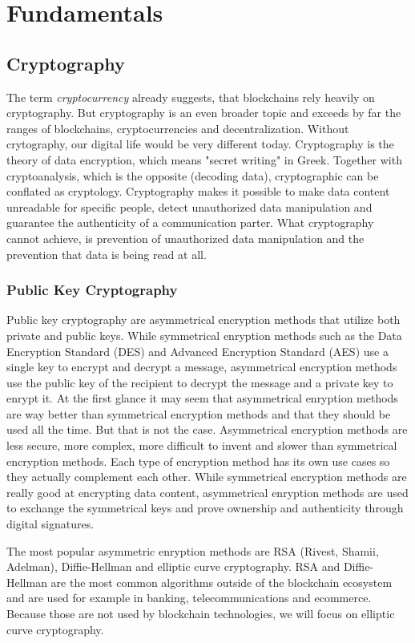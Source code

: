 \chapter{Fundamentals}
\label{cha:Fundamentals}

\section{Cryptography}

The term \textit{cryptocurrency} already suggests, that blockchains rely heavily on cryptography. But cryptography is an even broader topic and exceeds by far the ranges of blockchains, cryptocurrencies and decentralization. Without crytography, our digital life would be very different today. Cryptography is the theory of data encryption, which means "secret writing" in Greek. Together with cryptoanalysis, which is the opposite (decoding data), cryptographic can be conflated as cryptology. Cryptography makes it possible to make data content unreadable for specific people, detect unauthorized data manipulation and guarantee the authenticity of a communication parter. What cryptography cannot achieve, is prevention of unauthorized data manipulation and the prevention that data is being read at all.

\subsection{Public Key Cryptography}
Public key cryptography are asymmetrical encryption methods that utilize both private and public keys. While symmetrical enryption methods such as the Data Encryption Standard (DES) and Advanced Encryption Standard (AES) use a single key to encrypt and decrypt a message, asymmetrical encryption methods use the public key of the recipient to decrypt the message and a private key to enrypt it. At the first glance it may seem that asymmetrical enryption methods are way better than symmetrical encryption methods and that they should be used all the time. But that is not the case. Asymmetrical encryption methods are less secure, more complex, more difficult to invent and slower than symmetrical encryption methods. Each type of encryption method has its own use cases so they actually complement each other. While symmetrical encryption methods are really good at encrypting data content, asymmetrical enryption methods are used to exchange the symmetrical keys and prove ownership and authenticity through digital signatures.

The most popular asymmetric enryption methods are RSA (Rivest, Shamii, Adelman), Diffie-Hellman and elliptic curve cryptography. RSA and Diffie-Hellman are the most common algorithms outside of the blockchain ecosystem and are used for example in banking, telecommunications and ecommerce. Because those are not used by blockchain technologies, we will focus on elliptic curve cryptography.
